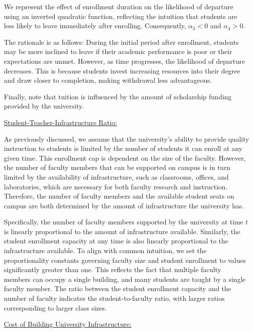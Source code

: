 We represent the effect of enrollment duration on the likelihood of departure using an inverted quadratic function, reflecting the intuition that students are less likely to leave immediately after enrolling. Consequently, $\alpha_3 < 0$ and $\alpha_4 > 0$.

The rationale is as follows: During the initial period after enrollment, students may be more inclined to leave if their academic performance is poor or their expectations are unmet. However, as time progresses, the likelihood of departure decreases. This is because students invest increasing resources into their degree and draw closer to completion, making withdrawal less advantageous.

Finally, note that tuition is influenced by the amount of scholarship funding provided by the university.

\underline{Student-Teacher-Infrastructure Ratio:}

As previously discussed, we assume that the university’s ability to provide quality instruction to students is limited by the number of students it can enroll at any given time. This enrollment cap is dependent on the size of the faculty. However, the number of faculty members that can be supported on campus is in turn limited by the availability of infrastructure, such as classrooms, offices, and laboratories, which are necessary for both faculty research and instruction. Therefore, the number of faculty members and the available student seats on campus are both determined by the amount of infrastructure the university has.

Specifically,  the number of faculty members supported by the university at time $t$ is linearly proportional to the amount of infrastructure available. Similarly, the student enrollment capacity at any time is also linearly proportional to the infrastructure available. To align with common intuition, we set the proportionality constants governing faculty size and student enrollment to values significantly greater than one. This reflects the fact that multiple faculty members can occupy a single building, and many students are taught by a single faculty member. The ratio between the student enrollment capacity and the number of faculty indicates the student-to-faculty ratio, with larger ratios corresponding to larger class sizes.

\underline{Cost of Building University Infrastructure:}

